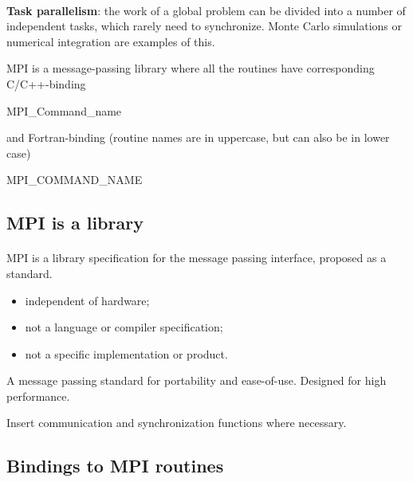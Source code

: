 \documentclass[%
oneside,                 %
final,                   %
10pt]{article}
\begin{document}
\paragraph{}
\textbf{Task parallelism}: the work of a global problem can be divided
into a number of independent tasks, which rarely need to synchronize. 
Monte Carlo simulations or numerical integration are examples of this.

MPI is a message-passing library where all the routines
have corresponding C/C++-binding


\bcppcod
   MPI_Command_name

\ecppcod

and Fortran-binding (routine names are in uppercase, but can also be in lower case)


\bforcod
   MPI_COMMAND_NAME

\eforcod



\subsection{MPI is a library}

\paragraph{}
MPI is a library specification for the message passing interface,
proposed as a standard.

\begin{itemize}
\item independent of hardware;

\item not a language or compiler specification;

\item not a specific implementation or product.
\end{itemize}

\noindent
A message passing standard for portability and ease-of-use. 
Designed for high performance.

Insert communication and synchronization functions where necessary.



\subsection{Bindings to MPI routines}
\end{document}
